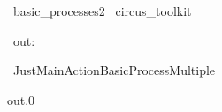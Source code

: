 
\begin{zsection}
  \SECTION\ basic\_processes2 \parents\ circus\_toolkit
\end{zsection}

\begin{circus}
    \circchannel\ out: \nat
\end{circus}


\begin{circus}
    \circprocess\ JustMainActionBasicProcessMultiple ~~\circdef~~ \circbegin
\end{circus}

\begin{circusaction}
    \circspot out.0 \then \Skip
\end{circusaction}

\begin{circus}
    \circend
\end{circus} 